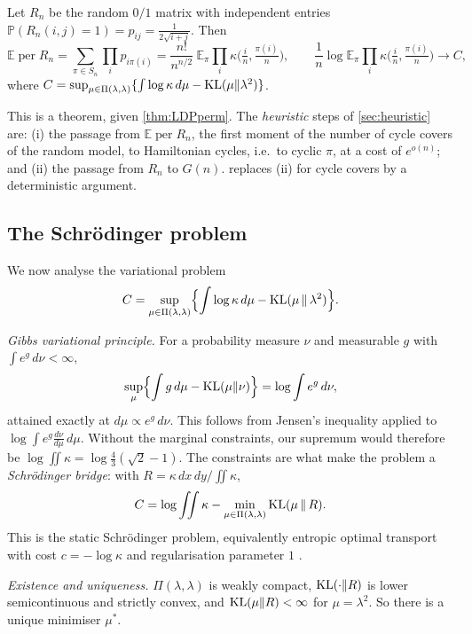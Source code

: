 \begin{proposition}\label{prop:firstmoment}
Let $R_n$ be the random $0/1$ matrix with independent entries
$\mathbb{P}(R_n(i,j)=1)=p_{ij}=\frac1{2\sqrt{i+j}}$. Then
\[
\mathbb{E}\operatorname{per}R_n=\sum_{\pi\in S_n}\prod_ip_{i\pi(i)}=\frac{n!}{n^{n/2}}\ \mathbb{E}_\pi\prod_i\kappa\bigl(\tfrac in,\tfrac{\pi(i)}n\bigr),
\qquad
\frac1n\log\mathbb{E}_\pi\prod_i\kappa\bigl(\tfrac in,\tfrac{\pi(i)}n\bigr)\longrightarrow C,
\]
where $C=\sup_{\mu\in\Pi(\lambda,\lambda)}\{\int\log\kappa\,d\mu-\mathrm{KL}(\mu\|\lambda^2)\}$.
\end{proposition}

This is a theorem, given \cref{thm:LDPperm}. The \emph{heuristic} steps of
\cref{sec:heuristic} are: (i) the passage from $\mathbb{E}\operatorname{per}R_n$, the
first moment of the number of cycle covers of the random model, to Hamiltonian cycles,
i.e.\ to cyclic $\pi$, at a cost of $e^{o(n)}$; and (ii) the passage from $R_n$ to $G(n)$.
 replaces (ii) for cycle covers by a deterministic argument.

\subsection{The Schr\"odinger problem}
We now analyse the variational problem
\[
C=\sup_{\mu\in\Pi(\lambda,\lambda)}\Bigl\{\int\log\kappa\,d\mu-\mathrm{KL}(\mu\,\|\,\lambda^2)\Bigr\}.
\]

\emph{Gibbs variational principle.} For a probability measure $\nu$ and measurable $g$
with $\int e^g\,d\nu<\infty$,
\[
\sup_\mu\Bigl\{\int g\,d\mu-\mathrm{KL}(\mu\|\nu)\Bigr\}=\log\int e^g\,d\nu,
\]
attained exactly at $d\mu\propto e^g\,d\nu$. This follows from Jensen's inequality applied to
$\log\int e^{g}\frac{d\nu}{d\mu}\,d\mu$. Without the marginal constraints, our
supremum would therefore be $\log\iint\kappa=\log\frac43(\sqrt2-1)$. The constraints are what
make the problem a \emph{Schr\"odinger bridge}: with
$R=\kappa\,dx\,dy/\iint\kappa$,
\[
C=\log\iint\kappa-\min_{\mu\in\Pi(\lambda,\lambda)}\mathrm{KL}(\mu\,\|\,R).
\]
This is the static Schr\"odinger problem, equivalently entropic optimal transport with cost
$c=-\log\kappa$ and regularisation parameter $1$ \cite{Leonard,Nutz,PeyreCuturi}.

\emph{Existence and uniqueness.} $\Pi(\lambda,\lambda)$ is weakly compact, $\mathrm{KL}(\cdot\|R)$
is lower semicontinuous and strictly convex, and $\mathrm{KL}(\mu\|R)<\infty$ for $\mu=\lambda^2$.
So there is a unique minimiser $\mu^*$.


